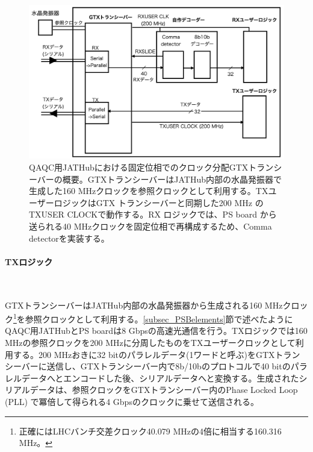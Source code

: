 \begin{figure} 
\centering
\includegraphics[width=16cm]{fig/QAQC/JATHubgtx.png}
\caption[QAQC用JATHubにおけるGTXトランシーバーの概要]{QAQC用JATHubにおける固定位相でのクロック分配GTXトランシーバーの概要。GTXトランシーバーはJATHub内部の水晶発振器で生成した160 MHzクロックを参照クロックとして利用する。TXユーザーロジックはGTX トランシーバーと同期した200 MHz のTXUSER CLOCKで動作する。RX ロジックでは、PS board から送られる40 MHzクロックを固定位相で再構成するため、Comma detectorを実装する。}
\label{JATHubgtx}
\end{figure}


\paragraph{TXロジック}　\par
GTXトランシーバーはJATHub内部の水晶発振器から生成される160 MHzクロック\footnote{正確にはLHCバンチ交差クロック40.079 MHzの4倍に相当する160.316 MHz。}を参照クロックとして利用する。\ref{subsec_PSBelements}節で述べたようにQAQC用JATHubとPS boardは8 Gbpsの高速光通信を行う。TXロジックでは160 MHzの参照クロックを200 MHzに分周したものをTXユーザークロックとして利用する。200 MHzおきに32 bitのパラレルデータ(1ワードと呼ぶ)をGTXトランシーバーに送信し、GTXトランシーバー内で8b/10bのプロトコルで40 bitのパラレルデータへとエンコードした後、シリアルデータへと変換する。生成されたシリアルデータは、参照クロックをGTXトランシーバー内のPhase Locked Loop (PLL) で冪倍して得られる4 Gbpsのクロックに乗せて送信される。

